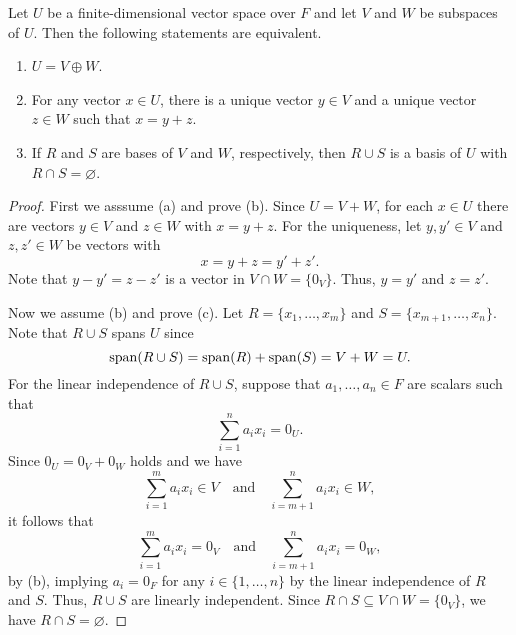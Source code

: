 \begin{theorem}
  \label{thm:direct-sum}
  Let $U$ be a finite-dimensional vector space over $F$ and let $V$ and $W$ be
  subspaces of $U$.
  Then the following statements are equivalent.
  \begin{enumerate}
    \item $U = V \oplus W$.
    \item For any vector $x \in U$, there is a unique vector $y \in V$ and a
    unique vector $z \in W$ such that $x = y + z$.
    \item If $R$ and $S$ are bases of $V$ and $W$, respectively, then
    $R \cup S$ is a basis of $U$ with $R \cap S = \varnothing$.
  \end{enumerate}
\end{theorem}
\begin{proof}
  First we asssume (a) and prove (b).
  Since $U = V + W$, for each $x \in U$ there are vectors $y \in V$ and
  $z \in W$ with $x = y + z$.
  For the uniqueness, let $y, y' \in V$ and $z, z' \in W$ be vectors with
  \begin{equation*}
    x = y + z = y' + z'.
  \end{equation*}
  Note that $y - y' = z - z'$ is a vector in $V \cap W = \{0_V\}$.
  Thus, $y = y'$ and $z = z'$.

  Now we assume (b) and prove (c).
  Let $R = \{x_1, \dots, x_m\}$ and $S = \{x_{m+1}, \dots, x_n\}$.
  Note that $R \cup S$ spans $U$ since
  \begin{equation*}
    \operatorname{span}(R \cup S) = \operatorname{span}(R) + \operatorname{span}(S) = V + W = U.
  \end{equation*}
  For the linear independence of $R \cup S$, suppose that $a_1, \dots, a_n \in
  F$ are scalars such that
  \begin{equation*}
    \sum_{i=1}^n a_ix_i = 0_U.
  \end{equation*}
  Since $0_U = 0_V + 0_W$ holds and we have
  \begin{equation*}
    \sum_{i=1}^m a_ix_i \in V
    \quad \text{and} \quad
    \sum_{i=m+1}^n a_ix_i \in W,
  \end{equation*}
  it follows that
  \begin{equation*}
    \sum_{i=1}^m a_ix_i = 0_V
    \quad \text{and} \quad
    \sum_{i=m+1}^n a_ix_i = 0_W,
  \end{equation*}
  by (b), implying $a_i = 0_F$ for any $i \in \{1, \dots, n\}$ by the linear
  independence of $R$ and $S$.
  Thus, $R \cup S$ are linearly independent.
  Since $R \cap S \subseteq V \cap W = \{0_V\}$, we have
  $R \cap S = \varnothing$.


\end{proof}
